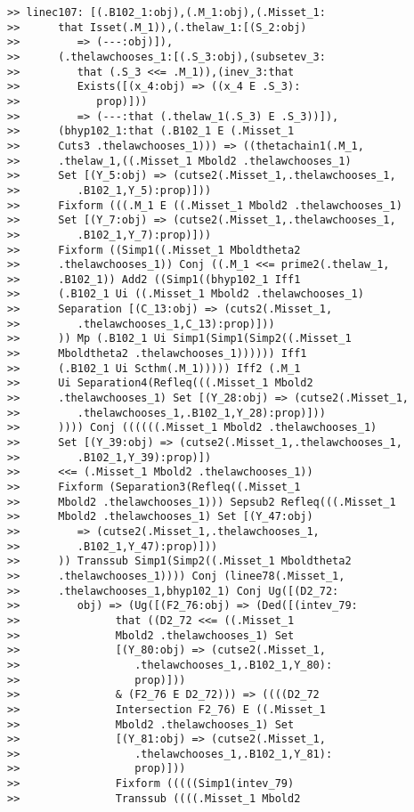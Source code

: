 \documentclass[12pt]{article}
\begin{document}
\begin{verbatim}
>> linec107: [(.B102_1:obj),(.M_1:obj),(.Misset_1:
>>      that Isset(.M_1)),(.thelaw_1:[(S_2:obj)
>>         => (---:obj)]),
>>      (.thelawchooses_1:[(.S_3:obj),(subsetev_3:
>>         that (.S_3 <<= .M_1)),(inev_3:that
>>         Exists([(x_4:obj) => ((x_4 E .S_3):
>>            prop)]))
>>         => (---:that (.thelaw_1(.S_3) E .S_3))]),
>>      (bhyp102_1:that (.B102_1 E (.Misset_1
>>      Cuts3 .thelawchooses_1))) => ((thetachain1(.M_1,
>>      .thelaw_1,((.Misset_1 Mbold2 .thelawchooses_1)
>>      Set [(Y_5:obj) => (cutse2(.Misset_1,.thelawchooses_1,
>>         .B102_1,Y_5):prop)]))
>>      Fixform (((.M_1 E ((.Misset_1 Mbold2 .thelawchooses_1)
>>      Set [(Y_7:obj) => (cutse2(.Misset_1,.thelawchooses_1,
>>         .B102_1,Y_7):prop)]))
>>      Fixform ((Simp1((.Misset_1 Mboldtheta2
>>      .thelawchooses_1)) Conj ((.M_1 <<= prime2(.thelaw_1,
>>      .B102_1)) Add2 ((Simp1((bhyp102_1 Iff1
>>      (.B102_1 Ui ((.Misset_1 Mbold2 .thelawchooses_1)
>>      Separation [(C_13:obj) => (cuts2(.Misset_1,
>>         .thelawchooses_1,C_13):prop)]))
>>      )) Mp (.B102_1 Ui Simp1(Simp1(Simp2((.Misset_1
>>      Mboldtheta2 .thelawchooses_1)))))) Iff1
>>      (.B102_1 Ui Scthm(.M_1))))) Iff2 (.M_1
>>      Ui Separation4(Refleq(((.Misset_1 Mbold2
>>      .thelawchooses_1) Set [(Y_28:obj) => (cutse2(.Misset_1,
>>         .thelawchooses_1,.B102_1,Y_28):prop)]))
>>      )))) Conj ((((((.Misset_1 Mbold2 .thelawchooses_1)
>>      Set [(Y_39:obj) => (cutse2(.Misset_1,.thelawchooses_1,
>>         .B102_1,Y_39):prop)])
>>      <<= (.Misset_1 Mbold2 .thelawchooses_1))
>>      Fixform (Separation3(Refleq((.Misset_1
>>      Mbold2 .thelawchooses_1))) Sepsub2 Refleq(((.Misset_1
>>      Mbold2 .thelawchooses_1) Set [(Y_47:obj)
>>         => (cutse2(.Misset_1,.thelawchooses_1,
>>         .B102_1,Y_47):prop)]))
>>      )) Transsub Simp1(Simp2((.Misset_1 Mboldtheta2
>>      .thelawchooses_1)))) Conj (linee78(.Misset_1,
>>      .thelawchooses_1,bhyp102_1) Conj Ug([(D2_72:
>>         obj) => (Ug([(F2_76:obj) => (Ded([(intev_79:
>>               that ((D2_72 <<= ((.Misset_1
>>               Mbold2 .thelawchooses_1) Set
>>               [(Y_80:obj) => (cutse2(.Misset_1,
>>                  .thelawchooses_1,.B102_1,Y_80):
>>                  prop)]))
>>               & (F2_76 E D2_72))) => ((((D2_72
>>               Intersection F2_76) E ((.Misset_1
>>               Mbold2 .thelawchooses_1) Set
>>               [(Y_81:obj) => (cutse2(.Misset_1,
>>                  .thelawchooses_1,.B102_1,Y_81):
>>                  prop)]))
>>               Fixform (((((Simp1(intev_79)
>>               Transsub ((((.Misset_1 Mbold2

\end{verbatim}
\end{document}
